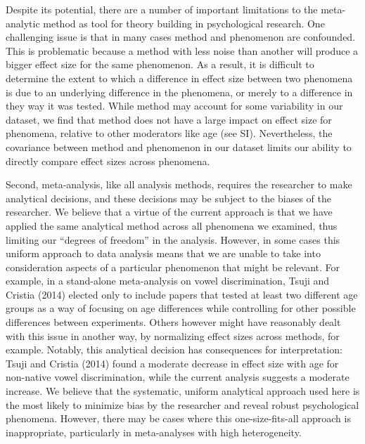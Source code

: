 \documentclass[9pt,twocolumn,twoside,lineno]{pnas-new}
\begin{document}
Despite its potential, there are a number of important limitations to
the meta-analytic method as tool for theory building in psychological
research. One challenging issue is that in many cases method and
phenomenon are confounded. This is problematic because a method with
less noise than another will produce a bigger effect size for the same
phenomenon. As a result, it is difficult to determine the extent to
which a difference in effect size between two phenomena is due to an
underlying difference in the phenomena, or merely to a difference in
they way it was tested. While method may account for some variability in
our dataset, we find that method does not have a large impact on effect
size for phenomena, relative to other moderators like age (see SI).
Nevertheless, the covariance between method and phenomenon in our
dataset limits our ability to directly compare effect sizes across
phenomena.

Second, meta-analysis, like all analysis methods, requires the
researcher to make analytical decisions, and these decisions may be
subject to the biases of the researcher. We believe that a virtue of the
current approach is that we have applied the same analytical method
across all phenomena we examined, thus limiting our \enquote{degrees of
freedom} in the analysis. However, in some cases this uniform approach
to data analysis means that we are unable to take into consideration
aspects of a particular phenomenon that might be relevant. For example,
in a stand-alone meta-analysis on vowel discrimination, Tsuji and
Cristia (2014) elected only to include papers that tested at least two
different age groups as a way of focusing on age differences while
controlling for other possible differences between experiments. Others
however might have reasonably dealt with this issue in another way, by
normalizing effect sizes across methods, for example. Notably, this
analytical decision has consequences for interpretation: Tsuji and
Cristia (2014) found a moderate decrease in effect size with age for
non-native vowel discrimination, while the current analysis suggests a
moderate increase. We believe that the systematic, uniform analytical
approach used here is the most likely to minimize bias by the researcher
and reveal robust psychological phenomena. However, there may be cases
where this one-size-fits-all approach is inappropriate, particularly in
meta-analyses with high heterogeneity.
\end{document}
